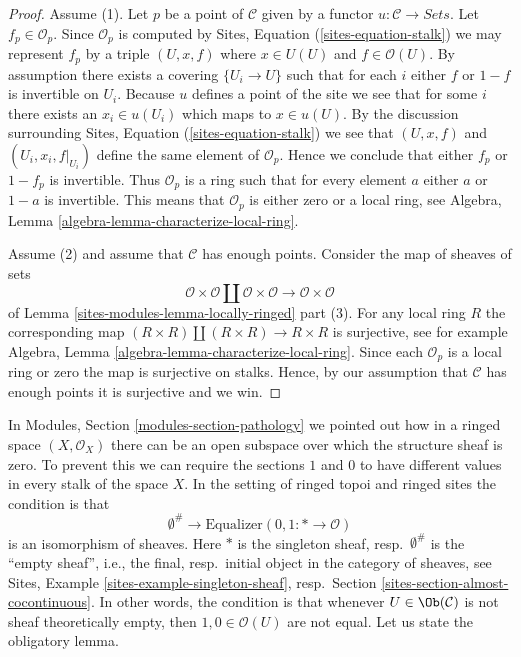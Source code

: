 \begin{proof}
Assume (1). Let $p$ be a point of $\mathcal{C}$ given by a functor
$u : \mathcal{C} \to \textit{Sets}$. Let
$f_p \in \mathcal{O}_p$. Since $\mathcal{O}_p$ is computed by
Sites, Equation (\ref{sites-equation-stalk})
we may represent $f_p$ by a triple
$(U, x, f)$ where $x \in U(U)$ and $f \in \mathcal{O}(U)$.
By assumption there exists a covering $\{U_i \to U\}$
such that for each $i$ either $f$ or $1 - f$ is invertible
on $U_i$. Because $u$ defines a point of the site we see that
for some $i$ there exists an $x_i \in u(U_i)$ which maps to
$x \in u(U)$. By the discussion surrounding
Sites, Equation (\ref{sites-equation-stalk})
we see that $(U, x, f)$ and $(U_i, x_i, f|_{U_i})$ define the
same element of $\mathcal{O}_p$. Hence we conclude that
either $f_p$ or $1 - f_p$ is invertible. Thus
$\mathcal{O}_p$ is a ring such that for every element $a$
either $a$ or $1 - a$ is invertible. This means that $\mathcal{O}_p$
is either zero or a local ring, see
Algebra, Lemma \ref{algebra-lemma-characterize-local-ring}.

\medskip\noindent
Assume (2) and assume that $\mathcal{C}$ has enough points.
Consider the map of sheaves of sets
$$
\mathcal{O} \times \mathcal{O} \amalg \mathcal{O} \times \mathcal{O}
\longrightarrow
\mathcal{O} \times \mathcal{O}
$$
of
Lemma \ref{sites-modules-lemma-locally-ringed} part (3). For any local ring $R$
the corresponding map
$(R \times R) \amalg (R \times R) \to R \times R$
is surjective, see for example
Algebra, Lemma \ref{algebra-lemma-characterize-local-ring}.
Since each $\mathcal{O}_p$ is a local ring or zero the map is
surjective on stalks. Hence, by our assumption that $\mathcal{C}$
has enough points it is surjective and we win.
\end{proof}

In
Modules, Section \ref{modules-section-pathology}
we pointed out how in a ringed space $(X, \mathcal{O}_X)$
there can be an open subspace over which the structure sheaf is zero.
To prevent this we can require the sections $1$ and $0$ to have different
values in every stalk of the space $X$. In the setting of ringed topoi
and ringed sites the condition is that
\begin{equation}
\label{equation-one-is-never-zero}
\emptyset^\# \longrightarrow
\text{Equalizer}(0, 1 : * \longrightarrow \mathcal{O})
\end{equation}
is an isomorphism of sheaves. Here $*$ is the singleton sheaf,
resp.\ $\emptyset^\#$ is the ``empty sheaf'',
i.e., the final, resp.\ initial object in the category of sheaves, see
Sites, Example \ref{sites-example-singleton-sheaf},
resp.\ Section \ref{sites-section-almost-cocontinuous}.
In other words, the condition is that whenever $U \in \Ob(\mathcal{C})$
is not sheaf theoretically empty, then $1, 0 \in \mathcal{O}(U)$ are not
equal. Let us state the obligatory lemma.

